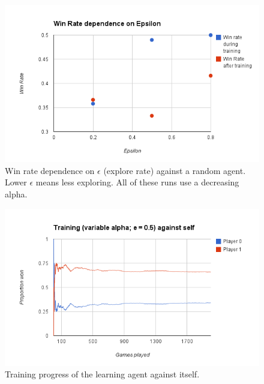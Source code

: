 \documentclass[letterpaper]{article}
\begin{document}
\begin{figure}
  \vspace{-2em}
  \begin{center}
    \includegraphics[width=\textwidth]{epsilonData.png}
    \vspace{-3em}
  \caption{Win rate dependence on $\epsilon$ (explore rate) against a random agent. Lower $\epsilon$ means less exploring. 
  All of these runs use a decreasing alpha.\label{epsilon}}
  \vspace{-1em}
  \end{center}
\end{figure}

\begin{figure}
  \vspace{-2em}
  \begin{center}
    \includegraphics[width=\textwidth]{valpha_qtraining.png}
    \vspace{-3em}
  \caption{Training progress of the learning agent against itself.\label{qtrain}}
  \vspace{-1em}
  \end{center}
\end{figure}
\end{document}
